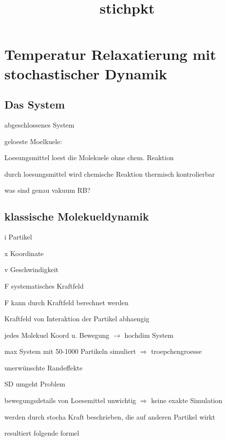 \documentclass[twocolumn]{article}
\title{stichpkt}
\let\tempone\itemize
\let\temptwo\enditemize
\renewenvironment{itemize}{\tempone\addtolength{\itemsep}{-.5\baselineskip}}{\temptwo}
\begin{document}
\section{Temperatur Relaxatierung mit stochastischer Dynamik}

\subsection{Das System}
\begin{itemize}
	\item abgeschlossenes System
	\item geloeste Moelkuele: 
	\begin{itemize}
		\item Loesungsmittel loest die Molekuele ohne chem. Reaktion
		\item durch loesungsmittel wird chemische Reaktion thermisch kontrolierbar
	\end{itemize}	
	\item was sind genau vakuum RB? %
\end{itemize}

\subsection{klassische Molekueldynamik}
\begin{itemize}
	\item i Partikel
	\item x Koordinate 
	\item v Geschwindigkeit
	\item F systematisches Kraftfeld
	\item F kann durch Kraftfeld berechnet werden
	\item Kraftfeld von Interaktion der Partikel abhaengig
	\item jedes Molekuel Koord u. Bewegung $\rightarrow$ hochdim System 
	\item max System mit 50-1000 Partikeln simuliert $\Rightarrow $ troepchengroesse
	\item unerwünschte Randeffekte
	\item SD umgeht Problem
	\item bewegungsdetails von Loesemittel unwichtig $\Rightarrow$ keine exakte Simulation
	\item werden durch stocha Kraft beschrieben, die auf anderen Partikel wirkt	
	\item resultiert folgende formel
\end{itemize}
\end{document}

